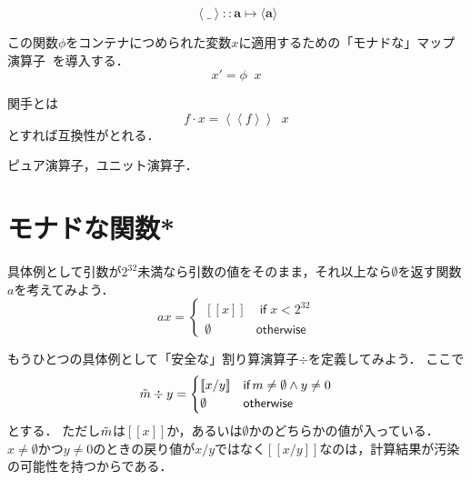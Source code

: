 \documentclass[a4paper,draft]{jsbook}
\def\[{\left[\!\left[}
\def\]{\right]\!\right]}
\newcommand{\mathTypeParameter}[1]{\mathbf{#1}}
\newcommand{\mathMaybeVar}[1]{\Tilde{#1}}
\newcommand{\mathMaybeWith}[1]{\[#1\]}
\newcommand{\mathPureWith}[1]{\left\langle#1\right\rangle}
\newcommand{\mathUnitWith}[1]{\left\langle\!\left\langle#1\right\rangle\!\right\rangle}
\newcommand{\mathNothing}{\emptyset}
\newcommand{\mathAny}{\_}
\newcommand{\mathAnd}{\mathbin{\wedge}}
\newcommand{\mathGeneralMap}{\mathbin{\cdot}}
\newcommand{\mathIn}{\mathrel{::}}
\newcommand{\mathMapsTo}{\mapsto}
\newcommand{\mathKeyword}[1]{\operatorname{\textsf{#1}}}
\newcommand{\mathIf}{\mathKeyword{if}}
\newcommand{\mathOtherwise}{\mathKeyword{otherwise}}
\newcommand{\mathMorph}[2]{#1\mathMapsTo#2}
\DeclareMathOperator{\hsklMonadMap}{{DO NOT USE}--\heartsuit}
\begin{document}
$$\mathPureWith{\mathAny}\mathIn\mathMorph{\mathTypeParameter{a}}{\langle\mathTypeParameter{a}\rangle}$$

この関数$\phi$をコンテナにつめられた変数$x$に適用するための「モナドな」マップ演算子$\hsklMonadMap$を導入する．
$$x'=\phi\hsklMonadMap x$$

関手とは
$$f\mathGeneralMap x=\mathUnitWith{f}\hsklMonadMap x$$
とすれば互換性がとれる．


ピュア演算子，ユニット演算子．


\section{モナドな関数*}


具体例として引数が$2^{32}$未満なら引数の値をそのまま，それ以上なら$\mathNothing$を返す関数$a$を考えてみよう．
\begin{equation}
ax=\begin{cases}
\mathMaybeWith{x}&\mathIf x<2^{32}\\
\mathNothing&\mathOtherwise
\end{cases}
\end{equation}


もうひとつの具体例として「安全な」割り算演算子$\div$を定義してみよう．
ここで
\begin{equation}
\mathMaybeVar{m}\div y=\begin{cases}\mathMaybeWith{x/y}&\mathIf m\neq\mathNothing\mathAnd y\neq0\\
\mathNothing&\mathOtherwise\end{cases}
\end{equation}
とする．
ただし$\mathMaybeVar{m}$は$\mathMaybeWith{x}$か，あるいは$\mathNothing$かのどちらかの値が入っている．
$x\neq\mathNothing$かつ$y\neq0$のときの戻り値が$x/y$ではなく$\mathMaybeWith{x/y}$なのは，計算結果が汚染の可能性を持つからである．
\end{document}
